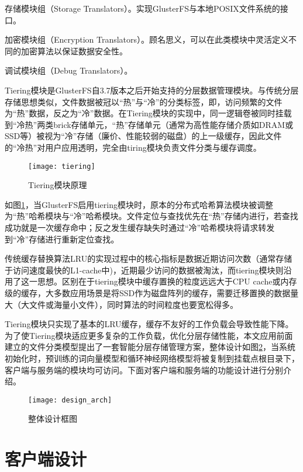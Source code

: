 存储模块组（Storage Translators）。实现GlusterFS与本地POSIX文件系统的接口。

加密模块组（Encryption Translators）。顾名思义，可以在此类模块中灵活定义不同的加密算法以保证数据安全性。

调试模块组（Debug Translators）。

Tiering模块是GlusterFS自3.7版本之后开始支持的分层数据管理模块\cite{Tiering}。与传统分层存储思想类似，文件数据被冠以“热”与“冷”的分类标签，即，访问频繁的文件为“热”数据，反之为“冷”数据。在Tiering模块的实现中，同一逻辑卷被同时挂载到“冷热”两类brick存储单元，“热”存储单元（通常为高性能存储介质如DRAM或SSD等）被视为“冷”存储（廉价、性能较弱的磁盘）的上一级缓存，因此文件的“冷热”对用户应用透明，完全由tiring模块负责文件分类与缓存调度。

\begin{figure}[htp]
\centering
\texttt{[image: tiering]}
\caption{Tiering模块原理}
\label{fig:tiering}
\end{figure}

如图\ref{fig:tiering}，当GlusterFS启用tiering模块时，原本的分布式哈希算法模块被调整为“热”哈希模块与“冷”哈希模块。文件定位与查找优先在“热”存储内进行，若查找成功就是一次缓存命中；反之发生缓存缺失时通过“冷”哈希模块将请求转发到“冷”存储进行重新定位查找。

传统缓存替换算法LRU的实现过程中的核心指标是数据近期访问次数（通常存储于访问速度最快的L1-cache中)，近期最少访问的数据被淘汰，而tiering模块则沿用了这一思想。区别在于tiering模块中缓存置换的粒度远远大于CPU cache或内存级的缓存，大多数应用场景是将SSD作为磁盘阵列的缓存，需要迁移置换的数据量大（大文件或海量小文件），同时算法的时间粒度也要宽松得多。

Tiering模块只实现了基本的LRU缓存，缓存不友好的工作负载会导致性能下降。为了使Tiering模块适应更多复杂的工作负载，优化分层存储性能，本文应用前面建立的文件分类模型提出了一套智能分层存储管理方案，整体设计如图\ref{fig:design_architecture}，当系统初始化时，预训练的词向量模型和循环神经网络模型将被复制到挂载点根目录下，客户端与服务端的模块均可访问。下面对客户端和服务端的功能设计进行分别介绍。

\begin{figure}[htp]
\centering
\texttt{[image: design\_arch]}
\caption{整体设计框图}
\label{fig:design_architecture}
\end{figure}

\section{客户端设计}


